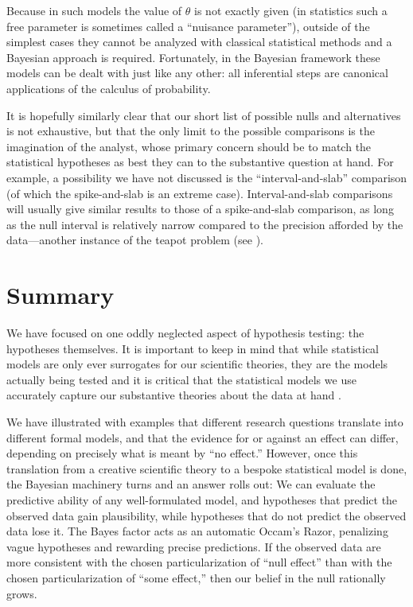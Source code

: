 Because in such models the value of $\theta$ is not exactly given (in statistics such a free parameter is sometimes called a ``nuisance parameter''), outside of the simplest cases they cannot be analyzed with classical statistical methods and a Bayesian approach is required.  Fortunately, in the Bayesian framework these models can be dealt with just like any other: all inferential steps are canonical applications of the calculus of probability.

It is hopefully similarly clear that our short list of possible nulls and alternatives is not exhaustive, but that the only limit to the possible comparisons is the imagination of the analyst, whose primary concern should be to match the statistical hypotheses as best they can to the substantive question at hand.  For example, a possibility we have not discussed is the ``interval-and-slab'' comparison (of which the spike-and-slab is an extreme case). Interval-and-slab comparisons will usually give similar results to those of a spike-and-slab comparison, as long as the null interval is relatively narrow compared to the precision afforded by the data---another instance of the teapot problem (see ).

\section*{Summary}
We have focused on one oddly neglected aspect of hypothesis testing: the hypotheses themselves.  It is important to keep in mind that while statistical models are only ever surrogates for our scientific theories, they are the models actually being tested and it is critical that the statistical models we use accurately capture our substantive theories about the data at hand \cite<see also>{rouder2017theories,Vanpaemel:2010}.

We have illustrated with examples that different research questions translate into different formal models, and that the evidence for or against an effect can differ, depending on precisely what is meant by ``no effect.'' However, once this translation from a creative scientific theory to a bespoke statistical model is done, the Bayesian machinery turns and an answer rolls out: We can evaluate the predictive ability of any well-formulated model, and hypotheses that predict the observed data gain plausibility, while hypotheses that do not predict the observed data lose it. {The Bayes factor acts as an automatic Occam's Razor, penalizing vague hypotheses and rewarding precise predictions.} If the observed data are more consistent with the chosen particularization of ``null effect'' than with the chosen particularization of ``some effect,'' then our belief in the null rationally grows.

